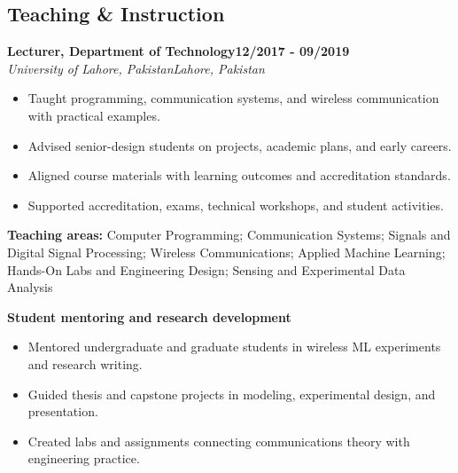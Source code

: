 \documentclass[10pt,letterpaper]{extarticle}
\newcommand{\role}[4]{%
  \Needspace{4\baselineskip}\textbf{#1}\hfill\textbf{#2}\\[-1pt]
  \textit{#3}\hfill\textit{#4}\par}
\begin{document}
\subsection{Teaching \& Instruction}
\role{Lecturer, Department of Technology}{12/2017 - 09/2019}{University of Lahore, Pakistan}{Lahore, Pakistan}
\begin{itemize}
\item Taught programming, communication systems, and wireless communication with practical examples.
\item Advised senior-design students on projects, academic plans, and early careers.
\item Aligned course materials with learning outcomes and accreditation standards.
\item Supported accreditation, exams, technical workshops, and student activities.
\end{itemize}
\vspace{1pt}
{\small\textbf{Teaching areas:} Computer Programming; Communication Systems; Signals and Digital Signal Processing; Wireless Communications; Applied Machine Learning; Hands-On Labs and Engineering Design; Sensing and Experimental Data Analysis}\par
{}\noindent\textbf{Student mentoring and research development}\par
\begin{itemize}
\item Mentored undergraduate and graduate students in wireless ML experiments and research writing.
\item Guided thesis and capstone projects in modeling, experimental design, and presentation.
\item Created labs and assignments connecting communications theory with engineering practice.
\end{itemize}
\end{document}
